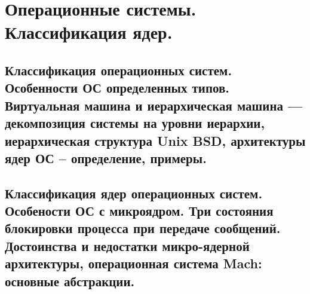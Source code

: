 \section{Операционные системы. Классификация ядер.}

\subsection{Классификация операционных систем. Особенности ОС определенных типов. Виртуальная машина и иерархическая машина --- декомпозиция системы на уровни иерархии, иерархическая структура Unix BSD, архитектуры ядер ОС – определение, примеры.}

\newpage

\subsection{Классификация ядер операционных систем. Особености ОС с микроядром. Три состояния блокировки процесса при передаче сообщений. Достоинства и недостатки микро-ядерной архитектуры, операционная система Mach: основные абстракции.}
